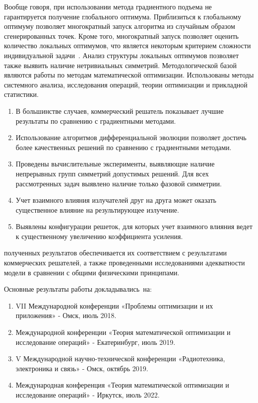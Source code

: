 {Вообще говоря, при использовании метода градиентного подъема не гарантируется получение глобального оптимума. Приблизиться к глобальному
оптимуму позволяет многократный запуск алгоритма из случайным образом сгенерированных точек. Кроме того, многократный запуск позволяет
оценить количество локальных оптимумов, что является некоторым критерием сложности индивидуальной задачи~\cite{eremeev:confidence}. Анализ структуры локальных оптимумов позволяет также выявить наличие нетривиальных симметрий.
}{
    Методологической базой являются работы по методам математической оптимизации. Использованы методы системного анализа, исследования операций, теории оптимизации и прикладной статистики.
}


{}
\begin{enumerate}[beginpenalty=10000] %
  \item В большинстве случаев, коммерческий решатель показывает лучшие результаты по сравнению с градиентными методами.
  \item Использование алгоритмов дифференциальной эволюции позволяет достичь более качественных решений по сравнению с градиентными методами.
  \item Проведены вычислительные эксперименты, выявляющие наличие непрерывных групп симметрий допустимых решений. Для всех рассмотренных задач выявлено наличие только фазовой симметрии.
  \item Учет взаимного влияния излучателей друг на друга может оказать существенное влияние на результирующее излучение.
  \item Выявлены конфигурации решеток, для которых учет взаимного влияния ведет к существенному увеличению коэффициента усиления.
\end{enumerate}

{\reliability} полученных результатов обеспечивается их соответствием с результатами коммерческих решателей, а также проведенными исследованиями адекватности модели в сравнении с общими физическими принципами.


{\probation}
Основные результаты работы докладывались~на:
\begin{enumerate}[beginpenalty=10000] %
  \item VII Международной конференции «Проблемы оптимизации и их приложения» - Омск, июль 2018.
  \item Международной конференции «Теория математической оптимизации и исследование операций» - Екатеринбург, июль 2019.
  \item V Международной научно-технической конференции «Радиотехника, электроника и связь» - Омск, октябрь 2019.
  \item Международная конференция «Теория математической оптимизации и исследование операций» - Иркутск, июль 2022.
\end{enumerate}


